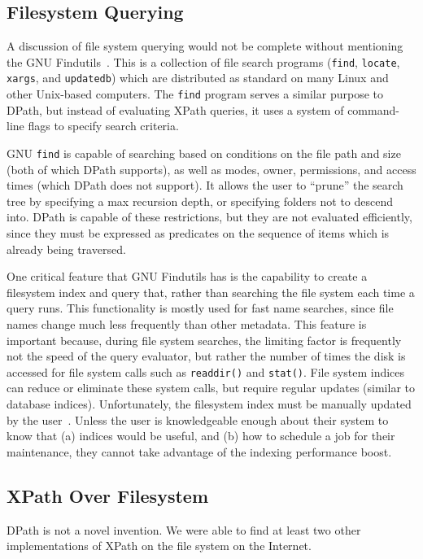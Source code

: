 \documentclass{article}
\begin{document}
\subsection{Filesystem Querying}

A discussion of file system querying would not be complete without mentioning
the GNU Findutils~\cite{find}. This is a collection of file search programs
(\texttt{find}, \texttt{locate}, \texttt{xargs}, and \texttt{updatedb}) which
are distributed as standard on many Linux and other Unix-based computers. The
\texttt{find} program serves a similar purpose to DPath, but instead of
evaluating XPath queries, it uses a system of command-line flags to specify
search criteria.

GNU \texttt{find} is capable of searching based on conditions on the file path
and size (both of which DPath supports), as well as modes, owner, permissions,
and access times (which DPath does not support). It allows the user to ``prune''
the search tree by specifying a max recursion depth, or specifying folders not
to descend into. DPath is capable of these restrictions, but they are not
evaluated efficiently, since they must be expressed as predicates on the
sequence of items which is already being traversed.

One critical feature that GNU Findutils has is the capability to create a
filesystem index and query that, rather than searching the file system each time
a query runs. This functionality is mostly used for fast name searches, since
file names change much less frequently than other metadata. This feature is
important because, during file system searches, the limiting factor is
frequently not the speed of the query evaluator, but rather the number of times
the disk is accessed for file system calls such as \texttt{readdir()} and
\texttt{stat()}. File system indices can reduce or eliminate these system calls,
but require regular updates (similar to database indices). Unfortunately, the
filesystem index must be manually updated by the user~\cite{find}. Unless the
user is knowledgeable enough about their system to know that (a) indices would
be useful, and (b) how to schedule a job for their maintenance, they cannot take
advantage of the indexing performance boost.

\subsection{XPath Over Filesystem}

DPath is not a novel invention. We were able to find at least two other
implementations of XPath on the file system on the Internet.
\end{document}
